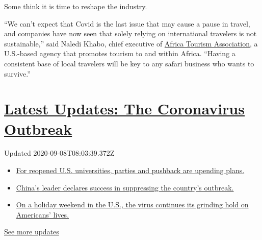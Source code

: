 Some think it is time to reshape the industry.

``We can't expect that Covid is the last issue that may cause a pause in
travel, and companies have now seen that solely relying on international
travelers is not sustainable,'' said Naledi Khabo, chief executive of
\href{https://africatourismassociation.org/}{Africa Tourism
Association}, a U.S.-based agency that promotes tourism to and within
Africa. ``Having a consistent base of local travelers will be key to any
safari business who wants to survive.''

\hypertarget{latest-updates-the-coronavirus-outbreak}{%
\section{\texorpdfstring{\href{https://www.nytimes3xbfgragh.onion/2020/09/07/world/covid-19-coronavirus.html?action=click\&pgtype=Article\&state=default\&region=MAIN_CONTENT_1\&context=storylines_live_updates}{Latest
Updates: The Coronavirus
Outbreak}}{Latest Updates: The Coronavirus Outbreak}}\label{latest-updates-the-coronavirus-outbreak}}

Updated 2020-09-08T08:03:39.372Z

\begin{itemize}
\tightlist
\item
  \href{https://www.nytimes3xbfgragh.onion/2020/09/07/world/covid-19-coronavirus.html?action=click\&pgtype=Article\&state=default\&region=MAIN_CONTENT_1\&context=storylines_live_updates\#link-71fba04f}{For
  reopened U.S. universities, parties and pushback are upending plans.}
\item
  \href{https://www.nytimes3xbfgragh.onion/2020/09/07/world/covid-19-coronavirus.html?action=click\&pgtype=Article\&state=default\&region=MAIN_CONTENT_1\&context=storylines_live_updates\#link-adc17f7}{China's
  leader declares success in suppressing the country's outbreak.}
\item
  \href{https://www.nytimes3xbfgragh.onion/2020/09/07/world/covid-19-coronavirus.html?action=click\&pgtype=Article\&state=default\&region=MAIN_CONTENT_1\&context=storylines_live_updates\#link-47c32b10}{On
  a holiday weekend in the U.S., the virus continues its grinding hold
  on Americans' lives.}
\end{itemize}

\href{https://www.nytimes3xbfgragh.onion/2020/09/07/world/covid-19-coronavirus.html?action=click\&pgtype=Article\&state=default\&region=MAIN_CONTENT_1\&context=storylines_live_updates}{See
more updates}


